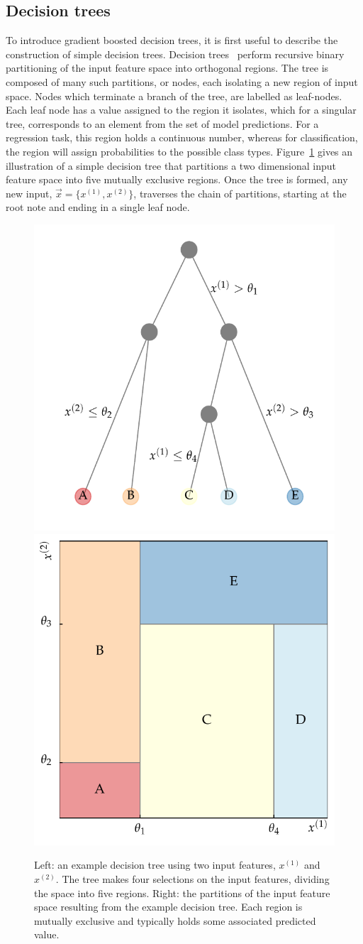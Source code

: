 \subsection{Decision trees}

To introduce gradient boosted decision trees, it is first useful to describe the construction of simple decision trees. Decision trees~\cite{DecisionTrees} perform recursive binary partitioning of the input feature space into orthogonal regions. The tree is composed of many such partitions, or nodes, each isolating a new region of input space. Nodes which terminate a branch of the tree, are labelled as leaf-nodes. Each leaf node has a value assigned to the region it isolates, which for a singular tree, corresponds to an element from the set of model predictions. For a regression task, this region holds a continuous number, whereas for classification, the region will assign probabilities to the possible class types. Figure~\ref{fig:hee_decision_tree_examples} gives an illustration of a simple decision tree that partitions a two dimensional input feature space into five mutually exclusive regions. Once the tree is formed, any new input, $\vec{x}=\{x^{(1)},x^{(2)}\}$, traverses the chain of partitions, starting at the root note and ending in a single leaf node.

\begin{figure}[htbp!]
\centering
\includegraphics[width =0.45\linewidth]{Figures/ML/BDT_tree_example.pdf}\hfill%
\includegraphics[width =0.45\linewidth]{Figures/ML/BDT_regions_example.pdf}\hfill%
\caption[The partitioning of input feature space for a decision tree with two features.]{Left: an example decision tree using two input features, $x^{(1)}$ and $x^{(2)}$. The tree makes four selections on the input features, dividing the space into five regions. Right: the partitions of the input feature space resulting from the example decision tree. Each region is mutually exclusive and typically holds some associated predicted value.}
\label{fig:hee_decision_tree_examples}
\end{figure}

